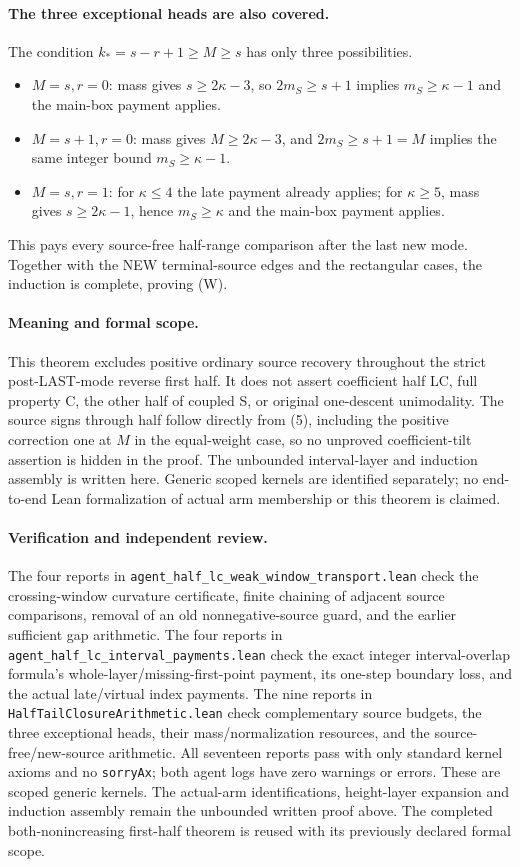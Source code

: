 \paragraph{The three exceptional heads are also covered.}
The condition $k_*=s-r+1\ge M\ge s$ has only three possibilities.
\begin{itemize}
\item $M=s,r=0$: mass gives $s\ge2\kappa-3$, so
$2m_S\ge s+1$ implies $m_S\ge\kappa-1$ and the main-box payment applies.
\item $M=s+1,r=0$: mass gives $M\ge2\kappa-3$, and
$2m_S\ge s+1=M$ implies the same integer bound $m_S\ge\kappa-1$.
\item $M=s,r=1$: for $\kappa\le4$ the late payment already applies;
for $\kappa\ge5$, mass gives $s\ge2\kappa-1$, hence
$m_S\ge\kappa$ and the main-box payment applies.
\end{itemize}
This pays every source-free half-range comparison after the last new mode.
Together with the NEW terminal-source edges and the rectangular cases,
the induction is complete, proving (W).

\paragraph{Meaning and formal scope.}
This theorem excludes positive ordinary source recovery throughout the
strict post-LAST-mode reverse first half. It does not assert coefficient
half LC, full property C, the other half of coupled S, or original
one-descent unimodality. The source signs through half follow directly
from (5), including the positive correction one at $M$ in the equal-weight
case, so no unproved coefficient-tilt assertion is hidden in the proof.
The unbounded interval-layer and induction assembly is written here.
Generic scoped kernels are identified separately; no end-to-end Lean
formalization of actual arm membership or this theorem is claimed.

\paragraph{Verification and independent review.}
The four reports in
\texttt{agent\_half\_lc\_weak\_window\_transport.lean} check the
crossing-window curvature certificate, finite chaining of adjacent
source comparisons, removal of an old nonnegative-source guard, and
the earlier sufficient gap arithmetic. The four reports in
\texttt{agent\_half\_lc\_interval\_payments.lean} check the exact
integer interval-overlap formula's whole-layer/missing-first-point
payment, its one-step boundary loss, and the actual late/virtual index
payments. The nine reports in \texttt{HalfTailClosureArithmetic.lean}
check complementary source budgets, the three exceptional heads, their
mass/normalization resources, and the source-free/new-source arithmetic.
All seventeen reports pass with only standard kernel axioms and no
\texttt{sorryAx}; both agent logs have zero warnings or errors.
These are scoped generic kernels. The actual-arm identifications,
height-layer expansion and induction assembly remain the unbounded
written proof above. The completed both-nonincreasing first-half theorem
is reused with its previously declared formal scope.

